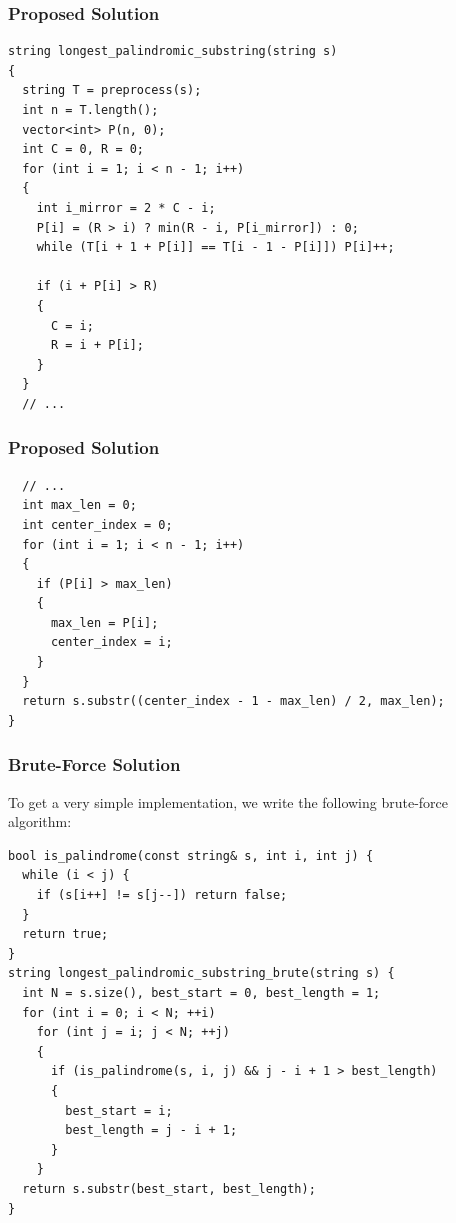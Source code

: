 \documentclass{beamer}
\begin{document}
\begin{frame}[containsverbatim]
\frametitle{Proposed Solution}

\scriptsize

\begin{lstlisting}
string longest_palindromic_substring(string s)
{
  string T = preprocess(s);
  int n = T.length();
  vector<int> P(n, 0);
  int C = 0, R = 0;
  for (int i = 1; i < n - 1; i++)
  {
    int i_mirror = 2 * C - i;
    P[i] = (R > i) ? min(R - i, P[i_mirror]) : 0;
    while (T[i + 1 + P[i]] == T[i - 1 - P[i]]) P[i]++;

    if (i + P[i] > R)
    {
      C = i;
      R = i + P[i];
    }
  }
  // ...
\end{lstlisting}

\end{frame}

\begin{frame}[containsverbatim]
\frametitle{Proposed Solution}

\scriptsize

\begin{lstlisting}
  // ...
  int max_len = 0;
  int center_index = 0;
  for (int i = 1; i < n - 1; i++)
  {
    if (P[i] > max_len)
    {
      max_len = P[i];
      center_index = i;
    }
  }
  return s.substr((center_index - 1 - max_len) / 2, max_len);
}
\end{lstlisting}

\end{frame}

\begin{frame}[containsverbatim]
\frametitle{Brute-Force Solution}

\scriptsize

To get a very simple implementation, we write the following brute-force algorithm:

\scriptsize

\begin{lstlisting}
bool is_palindrome(const string& s, int i, int j) {
  while (i < j) {
    if (s[i++] != s[j--]) return false;
  }
  return true;
}
string longest_palindromic_substring_brute(string s) {
  int N = s.size(), best_start = 0, best_length = 1;
  for (int i = 0; i < N; ++i)
    for (int j = i; j < N; ++j)
    {
      if (is_palindrome(s, i, j) && j - i + 1 > best_length)
      {
        best_start = i;
        best_length = j - i + 1;
      }
    }
  return s.substr(best_start, best_length);
}
\end{lstlisting}

\end{frame}
\end{document}

